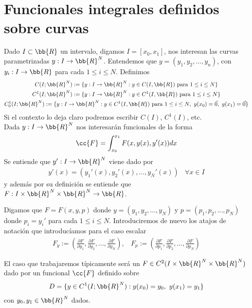 \section{Funcionales integrales definidos sobre curvas}
Dado $I\subset \bb{R}$ un intervalo, digamos $I=[x_0, x_1]$, nos interesan las curvas parametrizadas $y:I \to \bb{R}^N$. Entendemos que $y=(y_1,y_2,...,y_n)$, con $y_i:I\to \bb{R}$ para cada $1\leq i \leq N$. Definimos 
\begin{gather*}
    C(I;\bb{R}^N):= \{y:I\to \bb{R}^N : y\in C(I,\bb{R})\text{ para } 1\leq i \leq N\}\\
    C^1(I;\bb{R}^N):= \{y:I\to \bb{R}^N : y\in C^1(I,\bb{R})\text{ para } 1\leq i \leq N\}\\
    C_0^1(I;\bb{R}^N):= \{y:I\to \bb{R}^N : y\in C^1(I,\bb{R})\text{ para } 1\leq i \leq N,\ y(x_0) = \vec{0},\ y(x_1) = \vec{0}\}
\end{gather*}
Si el contexto lo deja claro podremos escribir $C(I)$, $C^1(I)$, etc.\\

Dada $y:I \to \bb{R}^N$ nos interesarán funcionales de la forma
\begin{gather*}
    \cc{F} = \int_{x_0}^{x_1} F(x, y(x), y'(x)) dx
\end{gather*}
Se entiende que $y':I \to \bb{R}^N$ viene dado por 
\begin{gather*}
    y'(x) = (y_1'(x), y_2'(x), ..., y_N'(x)) \ \ \ \ \forall x \in I
\end{gather*}
y además por su definición se entiende que $F:I\times \bb{R}^N \times \bb{R}^N \to \bb{R}$.\\

\begin{notacion}
    Digamos que $F=F(x,y,p)$ donde $y=(y_1, y_2,...,y_N)$ y $p = (p_1,p_2,...,p_N)$ donde $p_i = y_i'$ para cada $1\leq i \leq N$. Introduciremos de nuevo los atajos de notación que introducíamos para el caso escalar
    \begin{gather*}
        F_y := \left(\frac{\partial F}{\partial y_1}, \frac{\partial F}{\partial y_2}, ..., \frac{\partial F}{\partial y_N}\right),\ \ \ \
        F_p := \left(\frac{\partial F}{\partial p_1}, \frac{\partial F}{\partial p_2}, ..., \frac{\partial F}{\partial p_N}\right)
    \end{gather*}
\end{notacion}

El caso que trabajaremos típicamente será un $F\in C^2(I\times \bb{R}^N \times \bb{R}^N)$ dado por un funcional $\cc{F}$ definido sobre
\begin{gather*}
    D = \{y\in C^1(I;\bb{R}^N) : y(x_0) = y_0,\ y(x_1)=y_1\}
\end{gather*}
con $y_0, y_1\in \bb{R}^N$ dados.\\

